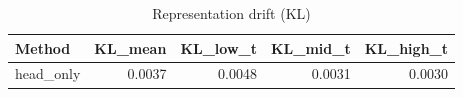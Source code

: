 \begin{table}[htbp]
\centering
\caption{Representation drift (KL)}
\label{tab:repr-drift}
\begin{tabular}{lrrrr}
\toprule
\textbf{Method} & \textbf{KL\_mean} & \textbf{KL\_low\_t} & \textbf{KL\_mid\_t} & \textbf{KL\_high\_t} \\
\midrule
head\_only & 0.0037 & 0.0048 & 0.0031 & 0.0030 \\
\bottomrule
\end{tabular}
\end{table}